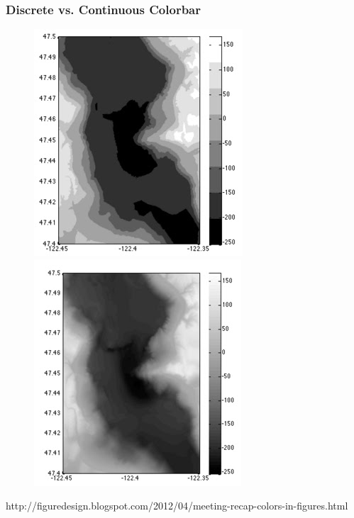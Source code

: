 \documentclass[ignorenonframetext]{beamer}
\begin{document}
\begin{frame}[t]\frametitle{Discrete vs. Continuous Colorbar}
	\begin{figure}
		\centering
		\includegraphics[width=.45\textwidth]{figures/bathy_discrete}
		\includegraphics[width=.45\textwidth]{figures/bathy_continuous}
	\end{figure}
    \tiny{http://figuredesign.blogspot.com/2012/04/meeting-recap-colors-in-figures.html}
\end{frame}
\end{document}
